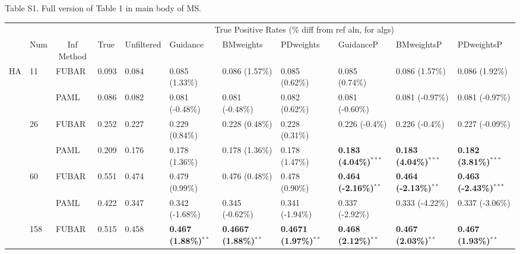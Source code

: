\documentclass[11pt]{article}
\begin{document}
\noindent Table S1. Full version of Table 1 in main body of MS.
\begin{sidewaystable}[htbp]
\begin{adjustwidth}{-2.25cm}{}
\begin{tabular}{l l l l l l l l l l l}
\hline\noalign{\smallskip}
& & & \multicolumn{8}{c}{True Positive Rates (\% diff from ref aln, for algs)} \\
\cline{4-11}\noalign{\smallskip}
\multicolumn{1}{c}{Profile} & \multicolumn{1}{c}{Num} & \multicolumn{1}{c}{Inf Method} & \multicolumn{1}{l}{True} & \multicolumn{1}{l}{Unfiltered} & \multicolumn{1}{l}{Guidance} & \multicolumn{1}{l}{BMweights} & \multicolumn{1}{l}{PDweights} & \multicolumn{1}{l}{GuidanceP} & \multicolumn{1}{l}{BMweightsP} & \multicolumn{1}{l}{PDweightsP} \\
\noalign{\smallskip}\hline\noalign{\smallskip}
HA  &  11  &  FUBAR  &  0.093  &  0.084  &  0.085 (1.33\%)  &  0.086 (1.57\%)  &  0.085 (0.62\%)  &  0.085 (0.74\%)  &  0.086 (1.57\%)  &  0.086 (1.92\%)  \\
  &    &  PAML       &  0.086  &  0.082  &  0.081 (-0.48\%)  &  0.081 (-0.48\%)  &  0.082 (0.62\%)  &  0.081 (-0.60\%)  &  0.081 (-0.97\%)  &  0.081 (-0.97\%)  \\
\hline
  &  26  &  FUBAR    &  0.252  &  0.227  &  0.229 (0.84\%)  &  0.228 (0.48\%)  &  0.228 (0.31\%)  &  0.226 (-0.4\%)  &  0.226 (-0.4\%)  &  0.227 (-0.09\%)  \\
  &    &  PAML       &  0.209  &  0.176  &  0.178 (1.36\%)  & 0.178 (1.36\%)  &  0.178 (1.47\%)  &  \textbf{0.183 (4.04\%)}$^{\ast\ast\ast}$  &  \textbf{0.183 (4.04\%)}$^{\ast\ast\ast}$  &  \textbf{0.182 (3.81\%)}$^{\ast\ast\ast}$  \\
\hline
  &  60  &  FUBAR    &  0.551  &  0.474  &  0.479 (0.99\%)  &  0.476 (0.48\%)  &  0.478 (0.90\%)  &  \textbf{0.464 (-2.16\%)}$^{\ast\ast}$  &  \textbf{0.464 (-2.13\%)}$^{\ast\ast}$  &  \textbf{0.463 (-2.43\%)}$^{\ast\ast\ast}$  \\
  &    &  PAML       &  0.422  &  0.347  &  0.342 (-1.68\%)  &  0.345 (-0.62\%)  &  0.341 (-1.94\%)  &  0.337 (-2.92\%)  &  0.333 (-4.22\%)  &  0.337 (-3.06\%)  \\
\hline
  &  158  &  FUBAR   &  0.515  &  0.458  & \textbf{0.467 (1.88\%)}$^{\ast\ast}$  &  \textbf{0.4667 (1.88\%)}$^{\ast\ast}$  &  \textbf{0.4671 (1.97\%)}$^{\ast\ast}$  &  \textbf{0.468 (2.12\%)}$^{\ast\ast}$  &  \textbf{0.467 (2.03\%)}$^{\ast\ast}$  &  \textbf{0.467 (1.93\%)}$^{\ast\ast}$  \\
\hline

\end{tabular}
\end{adjustwidth}
\end{sidewaystable}
\end{document}
